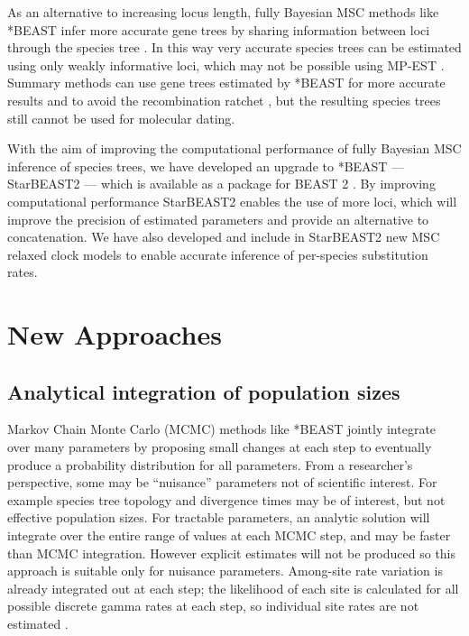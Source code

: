 \documentclass[12pt]{article}
\begin{document}
As an alternative to increasing locus length, fully Bayesian MSC methods like
*BEAST infer more accurate gene trees by sharing information between loci
through the species tree \citep{Szollosi01012015}. In this way very accurate
species trees can be estimated using only weakly informative loci, which may
not be possible using MP-EST \citep{Xu1353}. Summary methods can use gene
trees estimated by *BEAST for more accurate results and to avoid the
recombination ratchet \citep{Zimmermann2014}, but the resulting species trees
still cannot be used for molecular dating.

With the aim of improving the computational performance of fully Bayesian MSC
inference of species trees, we have developed an upgrade to *BEAST ---
StarBEAST2 --- which is available as a package for BEAST 2
\citep{10.1371/journal.pcbi.1003537}. By improving computational performance
StarBEAST2 enables the use of more loci, which will improve the
precision of estimated parameters and provide an alternative to concatenation.
We have also developed and include in StarBEAST2 new MSC relaxed clock models
to enable accurate inference of per-species substitution rates.

\section{New Approaches}

\subsection{Analytical integration of population sizes}

Markov Chain Monte Carlo (MCMC) methods like *BEAST jointly integrate
over many parameters by proposing small changes at each step to eventually
produce a probability distribution for all parameters. From a
researcher's perspective, some may be ``nuisance'' parameters not of scientific
interest. For example species tree topology and divergence times may be of
interest, but not effective population sizes. For tractable parameters, an
analytic solution will integrate over the entire range of values at each MCMC
step, and may be faster than MCMC integration. However explicit
estimates will not be produced so this approach is suitable only for nuisance
parameters. Among-site rate variation is already integrated out at each step;
the likelihood of each site is calculated for all possible discrete gamma rates
at each step, so individual site rates are not estimated \citep{Yang1994}.
\end{document}
